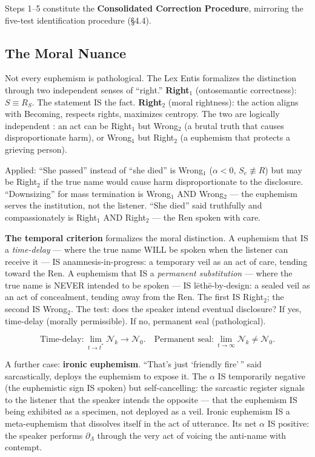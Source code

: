 \documentclass[11pt, oneside]{article}
\theoremstyle{definition}
\begin{document}
Steps 1--5 constitute the \textbf{Consolidated Correction Procedure}, mirroring the five-test identification procedure (\S4.4).

\subsection{The Moral Nuance}\label{sec:moral}

Not every euphemism is pathological. The Lex Entis \cite{lexentis} formalizes the distinction through two independent senses of ``right.'' \textbf{Right$_1$} (ontosemantic correctness): $S \equiv R_S$. The statement IS the fact. \textbf{Right$_2$} (moral rightness): the action aligns with Becoming, respects rights, maximizes centropy. The two are logically independent \cite{lexentis}: an act can be Right$_1$ but Wrong$_2$ (a brutal truth that causes disproportionate harm), or Wrong$_1$ but Right$_2$ (a euphemism that protects a grieving person).

Applied: ``She passed'' instead of ``she died'' is Wrong$_1$ ($\alpha < 0$, $S_e \not\equiv R$) but may be Right$_2$ if the true name would cause harm disproportionate to the disclosure. ``Downsizing'' for mass termination is Wrong$_1$ AND Wrong$_2$ --- the euphemism serves the institution, not the listener. ``She died'' said truthfully and compassionately is Right$_1$ AND Right$_2$ --- the Ren spoken with care.

\textbf{The temporal criterion} formalizes the moral distinction. A euphemism that IS a \textit{time-delay} --- where the true name WILL be spoken when the listener can receive it --- IS anamnesis-in-progress: a temporary veil as an act of care, tending toward the Ren. A euphemism that IS a \textit{permanent substitution} --- where the true name is NEVER intended to be spoken --- IS l\={e}th\={e}-by-design: a sealed veil as an act of concealment, tending away from the Ren. The first IS Right$_2$; the second IS Wrong$_2$. The test: does the speaker intend eventual disclosure? If yes, time-delay (morally permissible). If no, permanent seal (pathological).

$$\boxed{\text{Time-delay}: \lim_{t \to t^*} \mathcal{N}_k \to \mathcal{N}_0. \quad \text{Permanent seal}: \lim_{t \to \infty} \mathcal{N}_k \neq \mathcal{N}_0.}$$

A further case: \textbf{ironic euphemism}. ``That's just `friendly fire'\,'' said sarcastically, deploys the euphemism to expose it. The $\alpha$ IS temporarily negative (the euphemistic sign IS spoken) but self-cancelling: the sarcastic register signals to the listener that the speaker intends the opposite --- that the euphemism IS being exhibited as a specimen, not deployed as a veil. Ironic euphemism IS a meta-euphemism that dissolves itself in the act of utterance. Its net $\alpha$ IS positive: the speaker performs $\partial_\Lambda$ through the very act of voicing the anti-name with contempt.
\end{document}
